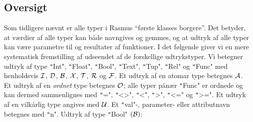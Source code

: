 \documentclass{article}
\begin{document}
\subsection{Oversigt}
Som tidligere n\ae{}vnt er alle typer i {\sc Rasmus}
``f\o{}rste klasses borgere''. Det betyder, at v\ae{}rdier af alle typer
kan b\aa{}de navngives og gemmes, og at udtryk af alle typer
kan v\ae{}re parametre til og resultater af funktioner. I det f\o{}lgende
giver vi en mere systematisk fremstilling af udseendet af de forskellige
udtrykstyper. Vi betegner udtryk af type 
\texttt"Int", \texttt"Float", \texttt"Bool", \texttt"Text", \texttt"Tup", \texttt"Rel"
og \texttt"Func" med henholdsvis $\cal I$, $\cal D$, $\cal B$, $\cal X$, $\cal T$, 
$\cal R$ og $\cal F$. Et udtryk af en atomar type betegnes $\cal A$.
Et udtryk af en {\em ordnet\/} type betegnes $\cal O$; alle typer
p\aa{}n\ae{}r \texttt"Func" er ordnede og kan dermed sammenlignes med
\texttt"=", \texttt"<>", \texttt"<", \texttt">", \texttt"<=" og \texttt">=".
Et udtryk af en vilk\aa{}rlig type angives med $\cal U$.
Et \texttt"val"-, parameter- eller
attributnavn betegnes med \texttt"n".
\newpage
Udtryk af type \texttt"Bool" $(\cal B)$:
\end{document}
